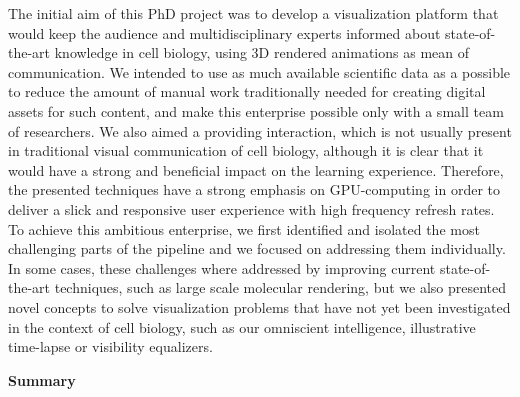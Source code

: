 The initial aim of this PhD project was to develop a visualization platform that would keep the audience and multidisciplinary experts informed about state-of-the-art knowledge in cell biology, using 3D rendered animations as mean of communication.
We intended to use as much available scientific data as a possible to reduce the amount of manual work traditionally needed for creating digital assets for such content, and make this enterprise possible only with a small team of researchers.
We also aimed a providing interaction, which is not usually present in traditional visual communication of cell biology, although it is clear that it would have a strong and beneficial impact on the learning experience.
Therefore, the presented techniques have a strong emphasis on GPU-computing in order to deliver a slick and responsive user experience with high frequency refresh rates. 
To achieve this ambitious enterprise, we first identified and isolated the most challenging parts of the pipeline and we focused on addressing them individually.
In some cases, these challenges where addressed by improving current state-of-the-art techniques, such as large scale molecular rendering, but we also presented novel concepts to solve visualization problems that have not yet been investigated in the context of cell biology, such as our omniscient intelligence, illustrative time-lapse or visibility equalizers.  

\textbf{Summary}

